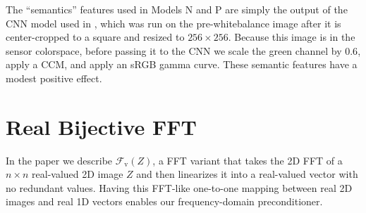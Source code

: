 \documentclass[10pt,twocolumn,letterpaper]{article}
\newcommand{\fftv}[1]{\mathcal{F}_\mathrm{v} \left( #1 \right)}
\begin{document}
The ``semantics'' features used in Models N and P are simply the output of the
CNN model used in \cite{Wang2014}, which was run on the pre-whitebalance image
after it is center-cropped to a square and resized to $256 \times 256$.
%
Because this image is in the sensor colorspace, before passing it to the CNN
we scale the green channel by $0.6$, apply a CCM, and apply an sRGB gamma
curve.
%
These semantic features have a modest positive effect.

\section{Real Bijective FFT}

In the paper we describe $\fftv{Z}$, a FFT variant
that takes the 2D FFT of a $n \times n$ real-valued 2D image $Z$ and then
linearizes it into a real-valued vector with no redundant values.
Having this FFT-like one-to-one mapping between real 2D images and real 1D vectors
enables our frequency-domain preconditioner.
\end{document}
